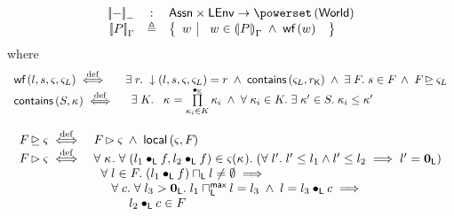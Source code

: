 %
%
\begin{definition}
%
\[
\begin{array}{r c l}
\sem[-]{-} & : & \Assertions \times \LEnv \rightarrow \pset{\Worlds} \\

\sem{P} & \eqdef & 
\left\{
\begin{array}{l | l}
 w &
 \begin{array}{l}
 	 w \in \intermediateSem{P} \;\land\;
 	 \wf{w}
 	\end{array} 
\end{array}
\right\}\\
\end{array}
\]
%
where 
%
\[
\begin{array}{l l}
	\textsf{wf}\left( l, s, \varsigma_{}, \varsigma_{L} \right) \stackrel{\mathrm{def}}{\iff} & \exists\; r.\; \downarrow\left(l, s, \varsigma_{}, \varsigma_{L}\right) = r  \;\land\; \textsf{contains}\left(\varsigma_{L}, r_{\textsf{K}}\right) \;\land\; \exists\; F_{}.\; s \in F_{} \;\land\; F_{} \unrhd \varsigma_{L}\\
	
	\textsf{contains}\left(S, \kappa_{}\right) \stackrel{\mathrm{def}}{\iff} & 
	\begin{array}{l}
		\exists\; K.\;\;\; \kappa_{} = \prod\limits_{\kappa_{i} \in K}^{\bullet_{\mathbb{K}}} \kappa_{i} \;\land\;
		\forall\; \kappa_{i} \in K.\; \exists\; \kappa_{}' \in S.\; \kappa_{i} \leq \kappa_{}'
	\end{array}
\end{array}
\]
%
\end{definition}
%
%
\[ 
\begin{array}{r l}
	F_{} \unrhd \varsigma_{} \stackrel{\mathrm{def}}{\iff}
 		& F_{} \rhd \varsigma_{} \;\land\; \textsf{local}\left(\varsigma_{}, F_{}\right)\\
 		
  F_{} \rhd \varsigma_{} \stackrel{\mathrm{def}}{\iff} 
 & \forall\; \kappa_{}.\; \forall\; (l_1 \bullet_{\textsf{L}} f, l_2 \bullet_{\textsf{L}} f) \in \varsigma_{}(\kappa_{}).\; (\forall\; l'.\; l' \leq l_1 \land l' \leq l_2 \implies l' = \mathbf{0}_{\textsf{L}} ) \\
 & \hspace*{0.2cm} \forall\; l \in F_{}.\; (l_1 \bullet_{\textsf{L}} f) \sqcap_{\textsf{L}} l \not= \emptyset \implies \\
 & \hspace*{0.5cm} \forall\; c.\; \forall\; l_3 > \mathbf{0}_{\textsf{L}}.\; l_1 \sqcap_{\textsf{L}}^{\textsf{max}} l = l_3 \;\land\; l = l_3 \bullet_{\textsf{L}} c\implies\\
 & \hspace*{1cm} l_2 \bullet_{\textsf{L}} c \in F_{}	 
\end{array}
\]
